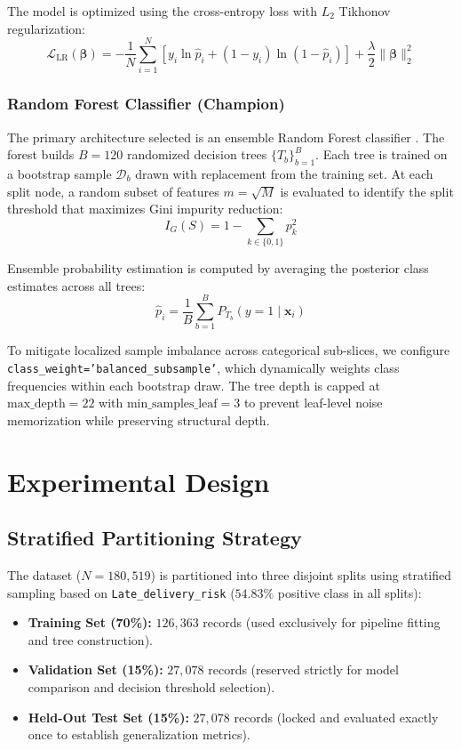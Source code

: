 \documentclass[journal,10pt,twocolumn]{IEEEtran}
\begin{document}
The model is optimized using the cross-entropy loss with $L_2$ Tikhonov regularization:
\begin{equation}
\mathcal{L}_{\text{LR}}(\boldsymbol{\beta}) = -\frac{1}{N}\sum_{i=1}^N \left[y_i \ln \hat{p}_i + (1 - y_i)\ln(1 - \hat{p}_i)\right] + \frac{\lambda}{2}\|\boldsymbol{\beta}\|_2^2
\end{equation}

\subsubsection{Random Forest Classifier (Champion)}
The primary architecture selected is an ensemble Random Forest classifier \cite{breiman2001random}. The forest builds $B = 120$ randomized decision trees $\{T_b\}_{b=1}^B$. Each tree is trained on a bootstrap sample $\mathcal{D}_b$ drawn with replacement from the training set. At each split node, a random subset of features $m = \sqrt{M}$ is evaluated to identify the split threshold that maximizes Gini impurity reduction:
\begin{equation}
I_G(S) = 1 - \sum_{k \in \{0, 1\}} p_k^2
\end{equation}

Ensemble probability estimation is computed by averaging the posterior class estimates across all trees:
\begin{equation}
\hat{p}_i = \frac{1}{B}\sum_{b=1}^B P_{T_b}(y = 1 \mid \mathbf{x}_i)
\label{eq:rf_prob}
\end{equation}

To mitigate localized sample imbalance across categorical sub-slices, we configure \texttt{class\_weight='balanced\_subsample'}, which dynamically weights class frequencies within each bootstrap draw. The tree depth is capped at $\text{max\_depth} = 22$ with $\text{min\_samples\_leaf} = 3$ to prevent leaf-level noise memorization while preserving structural depth.

\section{Experimental Design}
\label{sec:experimental_design}

\subsection{Stratified Partitioning Strategy}
The dataset ($N = 180,519$) is partitioned into three disjoint splits using stratified sampling based on \texttt{Late\_delivery\_risk} ($54.83\%$ positive class in all splits):
\begin{itemize}
    \item \textbf{Training Set (70\%):} $126,363$ records (used exclusively for pipeline fitting and tree construction).
    \item \textbf{Validation Set (15\%):} $27,078$ records (reserved strictly for model comparison and decision threshold selection).
    \item \textbf{Held-Out Test Set (15\%):} $27,078$ records (locked and evaluated exactly once to establish generalization metrics).
\end{itemize}
\end{document}
